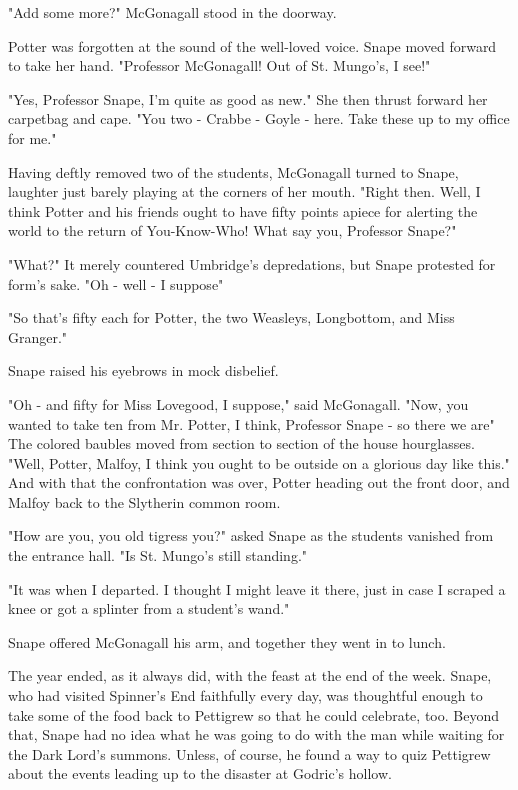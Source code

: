 "Add some more?" McGonagall stood in the doorway.

Potter was forgotten at the sound of the well-loved voice. Snape moved forward to take her hand. "Professor McGonagall! Out of St. Mungo's, I see!"

"Yes, Professor Snape, I'm quite as good as new." She then thrust forward her carpetbag and cape. "You two - Crabbe - Goyle - here. Take these up to my office for me."

Having deftly removed two of the students, McGonagall turned to Snape, laughter just barely playing at the corners of her mouth. "Right then. Well, I think Potter and his friends ought to have fifty points apiece for alerting the world to the return of{\el} You-Know-Who! What say you, Professor Snape?"

"What?" It merely countered Umbridge's depredations, but Snape protested for form's sake. "Oh - well - I suppose{\el}"

"So that's fifty each for Potter, the two Weasleys, Longbottom, and Miss Granger."

Snape raised his eyebrows in mock disbelief.

"Oh - and fifty for Miss Lovegood, I suppose," said McGonagall. "Now, you wanted to take ten from Mr. Potter, I think, Professor Snape - so there we are{\el}" The colored baubles moved from section to section of the house hourglasses. "Well, Potter, Malfoy, I think you ought to be outside on a glorious day like this." And with that the confrontation was over, Potter heading out the front door, and Malfoy back to the Slytherin common room.

"How are you, you old tigress you?" asked Snape as the students vanished from the entrance hall. "Is St. Mungo's still standing."

"It was when I departed. I thought I might leave it there, just in case I scraped a knee or got a splinter from a student's wand."

Snape offered McGonagall his arm, and together they went in to lunch.

The year ended, as it always did, with the feast at the end of the week. Snape, who had visited Spinner's End faithfully every day, was thoughtful enough to take some of the food back to Pettigrew so that he could celebrate, too. Beyond that, Snape had no idea what he was going to do with the man while waiting for the Dark Lord's summons. Unless, of course, he found a way to quiz Pettigrew about the events leading up to the disaster at Godric's hollow.


